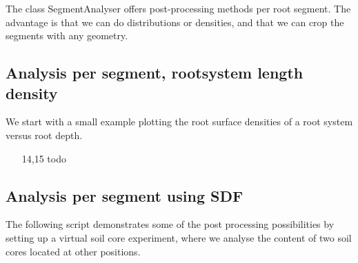 \documentclass[a4paper]{article}
\begin{document}
The class SegmentAnalyser offers post-processing methods per root segment. The advantage is that we can do distributions or densities, and that we can crop the segments with any geometry. 


\subsection{Analysis per segment, rootsystem length density}

We start with a small example plotting the root surface densities of a root system versus root depth.




\begin{itemize}

\item[14,15] todo

\end{itemize}



\subsection{Analysis per segment using SDF}

The following script demonstrates some of the post processing possibilities by setting up a virtual soil core experiment, where we analyse the content of two soil cores located at other positions.


\end{document}
